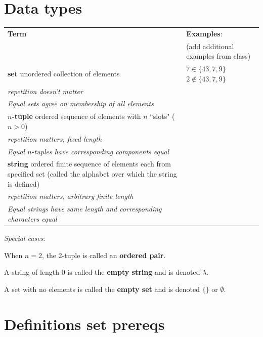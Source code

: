 \documentclass[12pt, oneside]{article}
\begin{document}
\begin{flushright}
\end{flushright} \section*{Data types}


\begin{center}
    \begin{tabular}{|p{4.6in}p{2.6in}|}
    \hline
    {\bf  Term} & {\bf Examples}:\\
    &  (add additional examples from class)\\
    \hline 
    {\bf set} \newline
    unordered collection of elements & $7 \in \{43, 7, 9 \}$ \qquad $2 \notin \{43, 7, 9 \}$ \\
    {\it repetition doesn't matter} & \\
    {\it Equal sets agree on membership of all elements}& \\
    \hline
    {\bf $n$-tuple} \newline
    ordered sequence of elements with $n$ ``slots" ($n >0$) & \\
    {\it repetition matters, fixed length} &\\
    {\it Equal $n$-tuples have corresponding components equal}& \\
    \hline
    {\bf string} \newline
    ordered finite sequence of elements each from specified
    set (called the alphabet over which the string is defined)& \\
    {\it repetition matters, arbitrary finite length} &\\
    {\it Equal strings have same length and corresponding characters equal}\\
    \hline
    \end{tabular}
\end{center}

{\it Special cases}: 

When $n=2$, the 2-tuple is called an {\bf ordered pair}.

A string of length $0$ is called the {\bf empty string} and is denoted $\lambda$.

A set with no elements is called the {\bf empty set} and is denoted $\{\}$ or $\emptyset$. \vfill
\section*{Definitions set prereqs}
\end{document}

